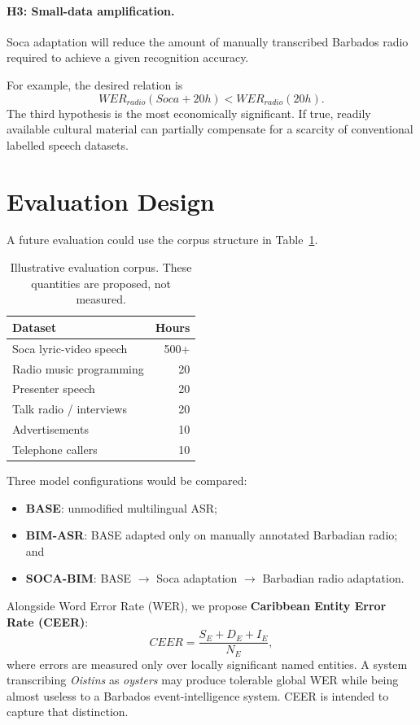 \documentclass[10pt,twocolumn]{article}
\begin{document}
\paragraph{H3: Small-data amplification.} Soca adaptation will reduce the amount of manually transcribed Barbados radio required to achieve a given recognition accuracy.

For example, the desired relation is
\begin{equation}
WER_{radio}(Soca + 20h) < WER_{radio}(20h).
\end{equation}
The third hypothesis is the most economically significant. If true, readily available cultural material can partially compensate for a scarcity of conventional labelled speech datasets.

\section{Evaluation Design}
A future evaluation could use the corpus structure in Table~\ref{tab:data}.

\begin{table}[h]
\centering
\caption{Illustrative evaluation corpus. These quantities are proposed, not measured.}
\label{tab:data}
\small
\begin{tabular}{p{}r}
\toprule
\textbf{Dataset} & \textbf{Hours}\\
\midrule
Soca lyric-video speech & 500+\\
Radio music programming & 20\\
Presenter speech & 20\\
Talk radio / interviews & 20\\
Advertisements & 10\\
Telephone callers & 10\\
\bottomrule
\end{tabular}
\end{table}

Three model configurations would be compared:
\begin{itemize}
\item \textbf{BASE}: unmodified multilingual ASR;
\item \textbf{BIM-ASR}: BASE adapted only on manually annotated Barbadian radio; and
\item \textbf{SOCA-BIM}: BASE $\rightarrow$ Soca adaptation $\rightarrow$ Barbadian radio adaptation.
\end{itemize}

Alongside Word Error Rate (WER), we propose \textbf{Caribbean Entity Error Rate (CEER)}:
\begin{equation}
CEER = \frac{S_E + D_E + I_E}{N_E},
\end{equation}
where errors are measured only over locally significant named entities. A system transcribing \emph{Oistins} as \emph{oysters} may produce tolerable global WER while being almost useless to a Barbados event-intelligence system. CEER is intended to capture that distinction.
\end{document}
